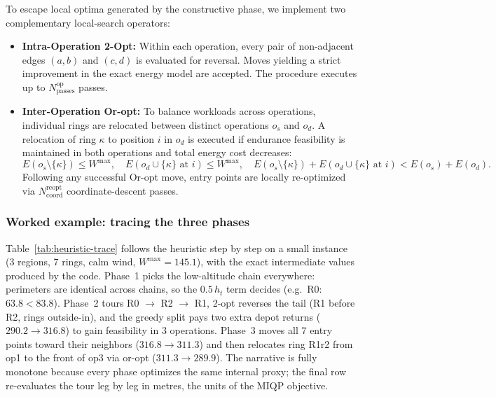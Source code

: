 \documentclass[12pt]{elsarticle}
\begin{document}
To escape local optima generated by the constructive phase, we implement two complementary local-search operators:

\begin{itemize}
	\item \textbf{Intra-Operation 2-Opt:} Within each operation, every pair of non-adjacent edges $(a,b)$ and $(c,d)$ is evaluated for reversal. Moves yielding a strict improvement in the exact energy model are accepted. The procedure executes up to $N_{\text{passes}}^{\text{op}}$ passes.
	\item \textbf{Inter-Operation Or-opt:} To balance workloads across operations, individual rings are relocated between distinct operations $o_s$ and $o_d$. A relocation of ring $\kappa$ to position $i$ in $o_d$ is executed if endurance feasibility is maintained in both operations and total energy cost decreases:
	\[
	E(o_s \setminus \{\kappa\}) \le W^{\max}, \quad E(o_d \cup \{\kappa\} \text{ at } i) \le W^{\max}, \quad E(o_s \setminus \{\kappa\}) + E(o_d \cup \{\kappa\} \text{ at } i) < E(o_s) + E(o_d).
	\]
	Following any successful Or-opt move, entry points are locally re-optimized via $N_{\text{coord}}^{\text{reopt}}$ coordinate-descent passes.
\end{itemize}

\subsubsection{Worked example: tracing the three phases}\label{sec:heuristic-trace}
Table~\ref{tab:heuristic-trace} follows the heuristic step by step on a small instance (3 regions, 7 rings, calm wind, $W^{\max}=145.1$), with the exact intermediate values produced by the code. Phase~1 picks the low-altitude chain everywhere: perimeters are identical across chains, so the $0.5\,h_t$ term decides (e.g.\ R0: $63.8<83.8$). Phase~2 tours R0 $\to$ R2 $\to$ R1, 2-opt reverses the tail (R1 before R2, rings outside-in), and the greedy split pays two extra depot returns ($290.2\to316.8$) to gain feasibility in 3 operations. Phase~3 moves all 7 entry points toward their neighbors ($316.8\to311.3$) and then relocates ring R1r2 from op1 to the front of op3 via or-opt ($311.3\to289.9$). The narrative is fully monotone because every phase optimizes the same internal proxy; the final row re-evaluates the tour leg by leg in metres, the units of the MIQP objective.
\end{document}

